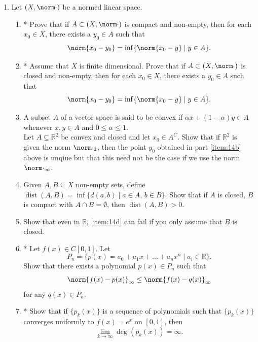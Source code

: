 \documentclass[notoc,notitlepage]{tufte-book}
\DeclareMathOperator{\dist}{dist }
\begin{document}
\begin{enumerate}
  \item Let $(X, \norm\cdot)$ be a normed linear space.
    \begin{enumerate}
      \item * Prove that if $A \subset (X, \norm\cdot)$ is compact and non-empty, then for each $x_0 \in X$, there exists a $y_0 \in A$ such that
        \begin{equation*}
          \norm{ x_0 - y_0 } = \inf \{ \norm{ x_0 - y } \mid y \in A \}.
        \end{equation*}
      \item * Assume that $X$ is finite dimensional. Prove that if $A \subset (X, \norm\cdot)$ is closed and non-empty, then for each $x_0 \in X$, there exists a $y_0 \in A$ such that \label{item:14b}
        \begin{equation*}
          \norm{ x_0 - y_0 } = \inf \{ \norm{ x_0 - y } \mid y \in A \}.
        \end{equation*}
      \item A subset $A$ of a vector space is said to be convex if $\alpha x + ( 1 - \alpha ) y \in A$ whenever $x, y \in A$ and $0 \leq \alpha \leq 1$. \\
        Let $A \subseteq \mathbb{R}^2$ be convex and closed and let $x_0 \in A^C$. Show that if $\mathbb{R}^2$ is given the norm $\norm\cdot_2$, then the point $y_0$ obtained in part \ref{item:14b} above is unqiue but that this need not be the case if we use the norm $\norm\cdot_\infty$.
      \item Given $A, B \subseteq X$ non-empty sets, define $\dist(A, B) = \inf \{ d(a, b) \mid a \in A, \, b \in B \}$. Show that if $A$ is closed, $B$ is compact with $A \cap B = \emptyset$, then $\dist(A, B) > 0$. \label{item:14d}
      \item Show that even in $\mathbb{R}$, \ref{item:14d} can fail if you only assume that $B$ is closed.
      \item * Let $f(x) \in C[ 0, 1 ]$. Let
        \begin{equation*}P_n = \{ p(x) = a_0 + a_1 x + \hdots + a_n x^n \mid a_i \in \mathbb{R} \}.
        \end{equation*}
        Show that there exists a polynomial $p(x) \in P_n$ such that
        \begin{equation*}
          \norm{ f(x) - p(x) }_\infty \leq \norm{ f(x) - q(x) }_\infty
        \end{equation*}
        for any $q(x) \in P_n$.
      \item * Show that if $\{ p_k(x) \}$ is a sequence of polynomials such that $\{ p_k(x) \}$ converges uniformly to $f(x) = e^x$ on $[0, 1]$, then
        \begin{equation*}
          \lim_{ k \to \infty } \deg (p_k(x)) = \infty.
        \end{equation*}
    \end{enumerate}


\end{enumerate}
\end{document}
